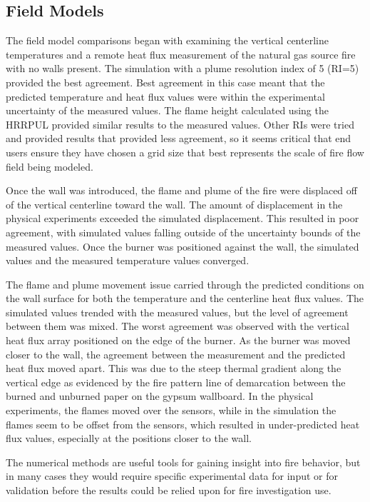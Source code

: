 \documentclass[twoside]{uocthesis}
\begin{document}
{\subsection{Field Models}

The field model comparisons began with examining the vertical centerline temperatures and a remote heat flux measurement of the natural gas source fire with no walls present.  The simulation with a plume resolution index of 5 (RI=5) provided the best agreement. Best agreement in this case meant that the predicted temperature and heat flux values were within the experimental uncertainty of the measured values. The flame height calculated using the HRRPUL provided similar results to the measured values.   Other RIs were tried and provided results that provided less agreement, so it seems critical that end users ensure they have chosen a grid size that best represents the scale of fire flow field being modeled.  

Once the wall was introduced, the flame and plume of the fire were displaced off of the vertical centerline toward the wall.  The amount of displacement in the physical experiments exceeded the simulated displacement.  This resulted in poor agreement, with simulated values falling outside of the uncertainty bounds of the measured values.  Once the burner was positioned against the wall, the simulated values and the measured temperature values converged.  

The flame and plume movement issue carried through the predicted conditions on the wall surface for both the temperature and the centerline heat flux values.  The simulated values trended with the measured values, but the level of agreement between them was mixed.  The worst agreement was observed with the vertical heat flux array positioned on the edge of the burner.  As the burner was moved closer to the wall, the agreement between the measurement and the predicted heat flux moved apart.  This was due to the steep thermal gradient along the vertical edge as evidenced by the fire pattern line of demarcation between the burned and unburned paper on the gypsum wallboard.  In the physical experiments, the flames moved over the sensors, while in the simulation the flames seem to be offset from the sensors, which resulted in under-predicted heat flux values, especially at the positions closer to the wall.

The numerical methods are useful tools for gaining insight into fire behavior, but in many cases they would require specific experimental data for input or for validation before the results could be relied upon for fire investigation use.

}
\end{document}

